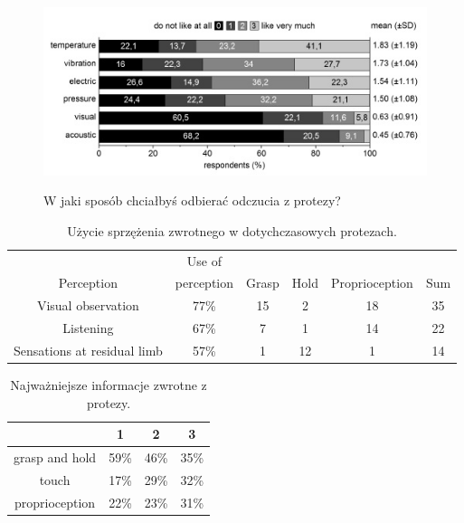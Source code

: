 \documentclass[8pt]{beamer}
\begin{document}
		\begin{frame}
			\begin{center}
				\begin{figure}
					\includegraphics[width=\textwidth]{graphics/way_of_feedback.jpg}
					\label{graph:feedback2}	
					\caption{W jaki sposób chciałbyś odbierać odczucia z protezy?  \cite{6226669}}
				\end{figure}
			\end{center}
		\end{frame}
		
		
		\begin{frame}
		\begin{center}
		\begin{table}
			\begin{tabular}{|c|c|c|c|c|c|}
			\hline
			 & Use of & & & &\\
			Perception & perception & Grasp & Hold & Proprioception & Sum \\
			\hline
			Visual observation & 77\% & 15 & 2 & 18 & 35 \\
			\hline
			Listening & 67\% & 7 & 1 & 14 & 22 \\
			\hline
			Sensations at residual limb & 57\% & 1 & 12 & 1 & 14\\
			\hline
			\end{tabular}								
			\caption{Użycie sprzężenia zwrotnego w dotychczasowych protezach.}
		\end{table}
		\end{center}		
		
		\begin{center}
		\begin{table}
		
			\begin{tabular}{|c|c|c|c|}
			\hline
			 & 1 & 2 & 3 \\
			\hline
			grasp and hold & 59\% & 46\% & 35\% \\
			\hline
			touch & 17\% & 29\% & 32\% \\
			\hline
			proprioception & 22\% & 23\% & 31\% \\
			\hline
			\end{tabular}	
			\caption{Najważniejsze informacje zwrotne z protezy.}						
		\end{table}
		\end{center}
		
		

			
		\end{frame}
\end{document}
